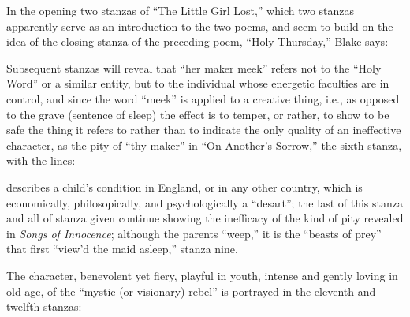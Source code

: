 In the opening two stanzas of \enquote{The Little Girl Lost,} which two stanzas apparently serve as an
introduction to the two poems, and seem to build on the idea of the closing stanza of the preceding poem,
\enquote{Holy Thursday,} Blake says:


Subsequent stanzas will reveal that \enquote{her maker meek} refers not to the \enquote{Holy Word} or a similar
entity, but to the individual whose energetic faculties are in control, and since the word \enquote{meek} is
applied to a creative thing, i.e., as opposed to the grave (sentence of sleep) the effect is to temper,
or rather, to show to be safe the thing it refers to rather than to indicate the only quality of an ineffective
character, as the pity of \enquote{thy maker} in \enquote{On Another's Sorrow,} the sixth stanza, with the lines:


\noindent describes a child's condition in England, or in any other country, which is
economically, philosopically, and psychologically a \enquote{desart}; the last of this stanza and all
of stanza given continue showing the inefficacy of the kind of pity revealed in \emph{Songs of Innocence};
although the parents \enquote{weep,} it is the \enquote{beasts of prey} that first \enquote{view'd the maid asleep,} stanza nine.

The character, benevolent yet fiery, playful in youth, intense and gently loving in old age, of the \enquote{mystic
(or visionary) rebel} is portrayed in the eleventh and twelfth stanzas:


